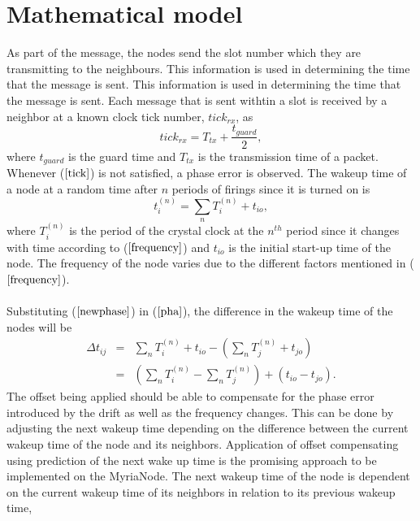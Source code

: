 \documentclass[a4paper,10pt]{report}
\begin{document}
\section{\textbf{Mathematical model}}
As part of the message, the nodes send the slot number which they
are transmitting to the neighbours. This information is used in
determining the time that the message is sent. This information is
used in determining the time that the message is sent. Each message
that is sent withtin a slot is received by a neighbor at a known
clock tick number, $tick_{rx}$, as
\begin{equation}
tick_{rx} = T_{tx}+ \dfrac{t_{guard}}{2}, \label{tick}
\end{equation}
where $t_{guard}$ is the guard time and $T_{tx}$ is the transmission
time of a packet. \newline Whenever ($\ref{tick}$) is not satisfied,
a phase error is observed. The wakeup time of a node at a random
time after $n$ periods of firings since it is turned on is
\begin{equation}
t_i^{(n)} = \sum_{n} T_i^{(n)} + t_{io},\label{newphase}
\end{equation}
where  $T_i^{(n)}$ is the period of the crystal clock at the
$n^{th}$ period since it changes with time according to
($\ref{frequency}$) and $t_{io}$ is the initial start-up time of the
node. The frequency of the node varies due to the different factors
mentioned in ($\ref{frequency}$). \paragraph*{} Substituting
($\ref{newphase}$) in ($\ref{pha}$), the difference in the wakeup
time of the nodes will be
\begin{eqnarray}
\Delta t_{ij} & = & \sum_{n}T_i^{(n)} + t_{io}- (\sum_{n}T_j^{(n)} +
t_{jo}) \\ &=& (\sum_{n}T_i^{(n)} - \sum_{n}T_j^{(n)}) +
(t_{io}-t_{jo}).
\end{eqnarray}
The offset being applied should be able to compensate for the phase
error introduced by the drift as well as the frequency changes. This
can be done by adjusting the next wakeup time depending on the
difference between the current wakeup time of the node and its
neighbors. Application of offset compensating using prediction of
the next wake up time is the promising approach to be implemented on
the MyriaNode. The next wakeup time of the node is dependent on the
current wakeup time of its neighbors in relation to its previous
wakeup time,
\end{document}
